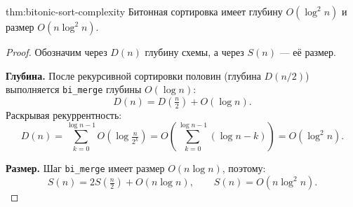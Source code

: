 \begin{Theorem}{}{thm:bitonic-sort-complexity}
	Битонная сортировка имеет глубину $O(\log^2 n)$ и размер $O(n\log^2 n)$.
\end{Theorem}

\begin{proof}
	Обозначим через $D(n)$ глубину схемы, а через $S(n)$ --- её размер.
	
	\textbf{Глубина.}
	После рекурсивной сортировки половин (глубина $D(n/2)$) выполняется \texttt{bi\_merge} глубины $O(\log n)$:
	\[
	D(n)=D\!\left(\tfrac{n}{2}\right)+O(\log n).
	\]
	Раскрывая рекуррентность:
	\[
	D(n)=\sum_{k=0}^{\log n - 1} O\!\left(\log\tfrac{n}{2^k}\right)
	= O\!\left(\sum_{k=0}^{\log n - 1}(\log n - k)\right)
	= O(\log^2 n).
	\]
	
	\textbf{Размер.}
	Шаг \texttt{bi\_merge} имеет размер $O(n\log n)$, поэтому:
	\[
	S(n)=2S\!\left(\tfrac{n}{2}\right)+O(n\log n),
	\qquad S(n)=O(n\log^2 n).
	\]
\end{proof}

